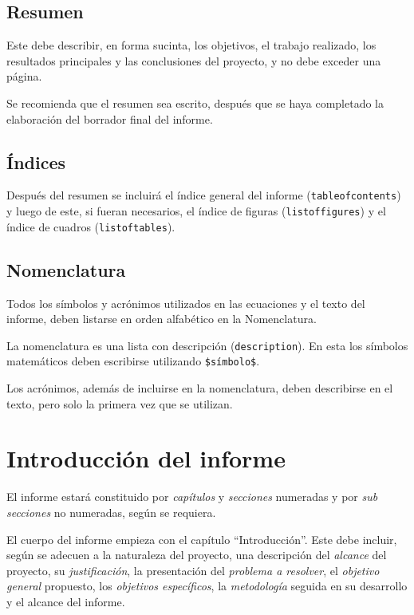 \subsection{Resumen}
Este debe describir, en forma sucinta, los objetivos, el trabajo realizado, los resultados principales y las conclusiones del proyecto, y no debe exceder una página.

Se recomienda que el resumen sea escrito, después que se haya completado la elaboración del borrador final del informe.

\subsection{Índices}
Después del resumen se incluirá el índice general  del informe (\texttt{tableofcontents}) y luego de este, si fueran necesarios, el índice de figuras (\texttt{listoffigures}) y el índice de cuadros (\texttt{listoftables}).

\subsection{Nomenclatura}
Todos los símbolos y acrónimos utilizados en las ecuaciones y el texto del informe, deben listarse en orden alfabético en la Nomenclatura.

La nomenclatura es una lista con descripción (\texttt{description}).  En esta los símbolos matemáticos deben escribirse utilizando \texttt{\$símbolo\$}.

Los acrónimos, además de incluirse en la nomenclatura, deben describirse en el texto, pero solo la primera vez que se utilizan.

\section{Introducción del informe}
El informe estará constituido por \emph{capítulos} y \emph{secciones} numeradas y  por \emph{sub secciones} no numeradas, según se requiera.

El cuerpo del informe empieza con el capítulo ``Introducción''.  Este  debe incluir, según se adecuen a la naturaleza del proyecto, una descripción del \emph{alcance} del proyecto, su \emph{justificación}, la presentación del \emph{problema a resolver}, el \emph{objetivo general} propuesto, los \emph{objetivos específicos}, la \emph{metodología} seguida en su desarrollo y el alcance del informe.

